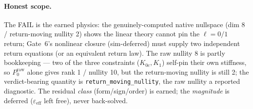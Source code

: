 \paragraph{Honest scope.}
The FAIL is the earned physics: the genuinely-computed native nullspace (dim 8 / return-moving nullity 2) shows the linear theory
cannot pin the \(\ell=0/1\) return; Gate~6's nonlinear closure (sim-deferred) must supply two independent return equations (or an
equivalent return law). The raw nullity 8 is partly bookkeeping --- two of the three constraints (\(K_{0c},K_1\)) self-pin their
own stiffness, so \(P_0^{\mathrm{raw}}\) alone gives rank 1 / nullity 10, but the return-moving nullity is still 2; the
verdict-bearing quantity is \texttt{return\_moving\_nullity}, the raw nullity a reported diagnostic. The residual \emph{class}
(form/sign/order) is earned; the \emph{magnitude} is deferred (\(\varepsilon_{\mathrm{eff}}\) left free), never back-solved.

